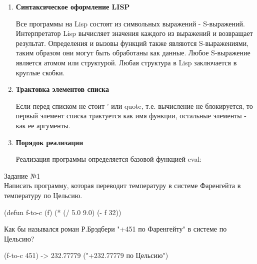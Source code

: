 \begin{enumerate}
\item \textbf{Синтаксическое оформление LISP}

Все программы на Lisp состоят из символьных выражений - S-выражений. Интерпретатор Lisp вычисляет значения каждого из выражений и возвращает результат. Определения и вызовы функций также являются S-выражениями, таким образом они могут быть обработаны как данные.  Любое S-выражение является атомом или структурой.
Любая структура в Lisp заключается в круглые скобки.

\item \textbf{Трактовка элементов списка}

Если перед списком не стоит ' или quote, т.е. вычисление не блокируется, то первый элемент списка трактуется как имя функции, остальные элементы - как ее аргументы.

\item \textbf{Порядок реализации}

Реализация программы определяется базовой функцией eval:
\begin{figure}[ht!]
\end{figure}
\end{enumerate}

\newpage
\vspace*{10mm}
{\LARGE Задание №1}\\

Написать программу, которая переводит температуру в системе Фаренгейта в температуру по Цельсию.

(defun f-to-c (f) (* (/ 5.0 9.0) (- f 32))

Как бы назывался роман Р.Брэдбери "+451 по Фаренгейту" в системе по Цельсию?

(f-to-c 451) -> 232.77779 ("+232.77779 по Цельсию")\\

